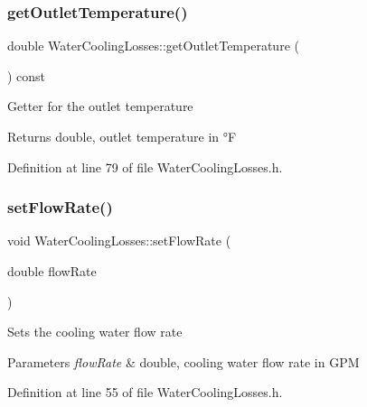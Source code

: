 \subsubsection{\texorpdfstring{get\+Outlet\+Temperature()}{getOutletTemperature()}\hspace{0.1cm}{\footnotesize\ttfamily [3/3]}}
{\footnotesize\ttfamily double Water\+Cooling\+Losses\+::get\+Outlet\+Temperature (\begin{DoxyParamCaption}{ }\end{DoxyParamCaption}) const\hspace{0.3cm}{\ttfamily [inline]}}

Getter for the outlet temperature \begin{DoxyReturn}{Returns}
double, outlet temperature in °F 
\end{DoxyReturn}


Definition at line 79 of file Water\+Cooling\+Losses.\+h.

\mbox{\label{class_water_cooling_losses_abf4d64d9261818af331613791374d42f}} 
\subsubsection{\texorpdfstring{set\+Flow\+Rate()}{setFlowRate()}\hspace{0.1cm}{\footnotesize\ttfamily [1/3]}}
{\footnotesize\ttfamily void Water\+Cooling\+Losses\+::set\+Flow\+Rate (\begin{DoxyParamCaption}\item[{double}]{flow\+Rate }\end{DoxyParamCaption})\hspace{0.3cm}{\ttfamily [inline]}}

Sets the cooling water flow rate 
\begin{DoxyParams}{Parameters}
{\em flow\+Rate} & double, cooling water flow rate in G\+PM \\
\hline
\end{DoxyParams}


Definition at line 55 of file Water\+Cooling\+Losses.\+h.

\mbox{\label{class_water_cooling_losses_abf4d64d9261818af331613791374d42f}} 
